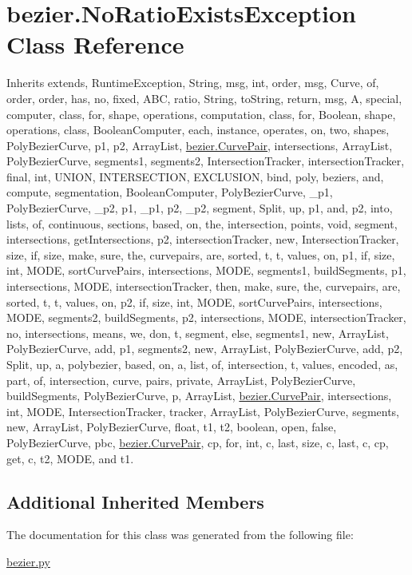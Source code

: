\hypertarget{classbezier_1_1_no_ratio_exists_exception}{}\section{bezier.\+No\+Ratio\+Exists\+Exception Class Reference}
\label{classbezier_1_1_no_ratio_exists_exception}


Inherits extends, Runtime\+Exception, String, msg, int, order, msg, Curve, of, order, order, has, no, fixed, A\+B\+C, ratio, String, to\+String, return, msg, A, special, computer, class, for, shape, operations, computation, class, for, Boolean, shape, operations, class, Boolean\+Computer, each, instance, operates, on, two, shapes, Poly\+Bezier\+Curve, p1, p2, Array\+List, \hyperlink{classbezier_1_1_curve_pair}{bezier.\+Curve\+Pair}, intersections, Array\+List, Poly\+Bezier\+Curve, segments1, segments2, Intersection\+Tracker, intersection\+Tracker, final, int, U\+N\+I\+O\+N, I\+N\+T\+E\+R\+S\+E\+C\+T\+I\+O\+N, E\+X\+C\+L\+U\+S\+I\+O\+N, bind, poly, beziers, and, compute, segmentation, Boolean\+Computer, Poly\+Bezier\+Curve, \+\_\+p1, Poly\+Bezier\+Curve, \+\_\+p2, p1, \+\_\+p1, p2, \+\_\+p2, segment, Split, up, p1, and, p2, into, lists, of, continuous, sections, based, on, the, intersection, points, void, segment, intersections, get\+Intersections, p2, intersection\+Tracker, new, Intersection\+Tracker, size, if, size, make, sure, the, curvepairs, are, sorted, t, t, values, on, p1, if, size, int, M\+O\+D\+E, sort\+Curve\+Pairs, intersections, M\+O\+D\+E, segments1, build\+Segments, p1, intersections, M\+O\+D\+E, intersection\+Tracker, then, make, sure, the, curvepairs, are, sorted, t, t, values, on, p2, if, size, int, M\+O\+D\+E, sort\+Curve\+Pairs, intersections, M\+O\+D\+E, segments2, build\+Segments, p2, intersections, M\+O\+D\+E, intersection\+Tracker, no, intersections, means, we, don, t, segment, else, segments1, new, Array\+List, Poly\+Bezier\+Curve, add, p1, segments2, new, Array\+List, Poly\+Bezier\+Curve, add, p2, Split, up, a, polybezier, based, on, a, list, of, intersection, t, values, encoded, as, part, of, intersection, curve, pairs, private, Array\+List, Poly\+Bezier\+Curve, build\+Segments, Poly\+Bezier\+Curve, p, Array\+List, \hyperlink{classbezier_1_1_curve_pair}{bezier.\+Curve\+Pair}, intersections, int, M\+O\+D\+E, Intersection\+Tracker, tracker, Array\+List, Poly\+Bezier\+Curve, segments, new, Array\+List, Poly\+Bezier\+Curve, float, t1, t2, boolean, open, false, Poly\+Bezier\+Curve, pbc, \hyperlink{classbezier_1_1_curve_pair}{bezier.\+Curve\+Pair}, cp, for, int, c, last, size, c, last, c, cp, get, c, t2, M\+O\+D\+E, and t1.

\subsection*{Additional Inherited Members}


The documentation for this class was generated from the following file\+:\begin{DoxyCompactItemize}
\item 
\hyperlink{bezier_8py}{bezier.\+py}\end{DoxyCompactItemize}

